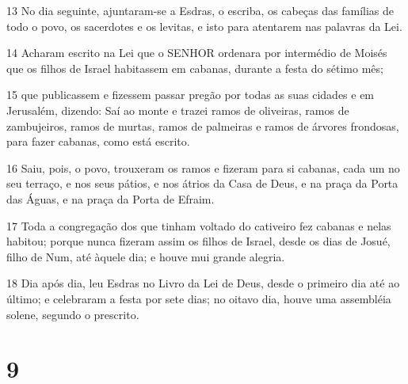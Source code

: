 \par 13 No dia seguinte, ajuntaram-se a Esdras, o escriba, os cabeças das famílias de todo o povo, os sacerdotes e os levitas, e isto para atentarem nas palavras da Lei.
\par 14 Acharam escrito na Lei que o SENHOR ordenara por intermédio de Moisés que os filhos de Israel habitassem em cabanas, durante a festa do sétimo mês;
\par 15 que publicassem e fizessem passar pregão por todas as suas cidades e em Jerusalém, dizendo: Saí ao monte e trazei ramos de oliveiras, ramos de zambujeiros, ramos de murtas, ramos de palmeiras e ramos de árvores frondosas, para fazer cabanas, como está escrito.
\par 16 Saiu, pois, o povo, trouxeram os ramos e fizeram para si cabanas, cada um no seu terraço, e nos seus pátios, e nos átrios da Casa de Deus, e na praça da Porta das Águas, e na praça da Porta de Efraim.
\par 17 Toda a congregação dos que tinham voltado do cativeiro fez cabanas e nelas habitou; porque nunca fizeram assim os filhos de Israel, desde os dias de Josué, filho de Num, até àquele dia; e houve mui grande alegria.
\par 18 Dia após dia, leu Esdras no Livro da Lei de Deus, desde o primeiro dia até ao último; e celebraram a festa por sete dias; no oitavo dia, houve uma assembléia solene, segundo o prescrito.

\chapter{9}

